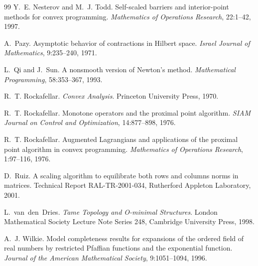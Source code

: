 \documentclass[a4paper,11pt]{book}
\theoremstyle{plain}
\theoremstyle{definition}
\theoremstyle{remark}
\numberwithin{equation}{chapter}
\numberwithin{algorithm}{chapter}
\begin{document}
\begin{thebibliography}{99}
		Y.~E. Nesterov and M.~J. Todd. Self-scaled barriers and interior-point methods
		for convex programming. \emph{Mathematics of Operations Research}, 22:1--42,
		1997.
		
		A.~Pazy. Asymptotic behavior of contractions in Hilbert space. \emph{Israel
			Journal of Mathematics}, 9:235--240, 1971.
		
		L.~Qi and J.~Sun. A nonsmooth version of Newton's method. \emph{Mathematical
			Programming}, 58:353--367, 1993.
		
		R.~T. Rockafellar. \emph{Convex Analysis}. Princeton University Press, 1970.
		
		R.~T. Rockafellar. Monotone operators and the proximal point algorithm.
		\emph{SIAM Journal on Control and Optimization}, 14:877--898, 1976.
		
		R.~T. Rockafellar. Augmented Lagrangians and applications of the proximal point
		algorithm in convex programming. \emph{Mathematics of Operations Research},
		1:97--116, 1976.
		
		D.~Ruiz. A scaling algorithm to equilibrate both rows and columns norms in
		matrices. Technical Report RAL-TR-2001-034, Rutherford Appleton Laboratory,
		2001.
		
		L.~van~den~Dries. \emph{Tame Topology and O-minimal Structures}. London
		Mathematical Society Lecture Note Series 248, Cambridge University Press, 1998.
		
		A.~J. Wilkie. Model completeness results for expansions of the ordered field of
		real numbers by restricted Pfaffian functions and the exponential function.
		\emph{Journal of the American Mathematical Society}, 9:1051--1094, 1996.
		
	\end{thebibliography}
	
\end{document}
